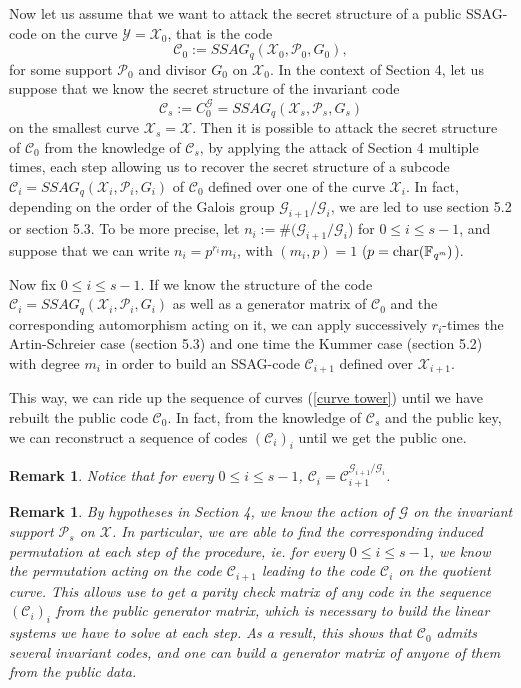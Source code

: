 \documentclass[10pt]{article}
\newtheorem{rq1}[thm]{Remark}
\newcommand{\s}{\vspace{0.3cm}}
\newcommand{\C}{\mathcal{C}}
\newcommand{\fqm}{\mathbb{F}_{q^m}}
\newcommand{\X}{\mathcal{X}}
\newcommand{\Y}{\mathcal{Y}}
\newcommand{\PR}{\mathcal{P}}
\newcommand{\G}{\mathcal{G}}
\begin{document}
Now let us assume that we want to attack the secret structure of a public SSAG-code on the curve $\Y=\X_0$, that is the code 
\[\C_0 := SSAG_q(\X_0,\PR_0,G_0),\]
for some support $\PR_0$ and divisor $G_0$ on $\X_0$. In the context of Section 4, let us suppose that we know the secret structure of the invariant code 
\[\C_s:= C_0^{\G} = SSAG_q(\X_s,\PR_s,G_s)\]
on the smallest curve $\X_s=\X$. Then it is possible to attack the secret structure of $\C_0$ from the knowledge of $\C_s$, by applying the attack of Section 4 multiple times, each step allowing us to recover the secret structure of a subcode $\C_i=SSAG_q(\X_i,\PR_i,G_i)$ of $\C_0$ defined over one of the curve $\X_i$. In fact, depending on the order of the Galois group $\G_{i+1}/\G_i$, we are led to use section 5.2 or section 5.3. 
To be more precise, let $n_i:= \#(\G_{i+1}/\G_i$) for $0 \leq i \leq s-1$, and suppose that we can write $n_i = p^{r_i}m_i$, with $(m_i,p)=1$ ($p=\rm char \it (\fqm)$). 
\s

Now fix $0 \leq i \leq s-1$. If we know the structure of the code $\C_i = SSAG_q(\X_i,\PR_i,G_i)$ as well as a generator matrix of $\C_0$ and the corresponding automorphism acting on it, we can apply successively $r_i$-times the Artin-Schreier case (section 5.3) and one time the Kummer case (section 5.2) with degree $m_i$ in order to build an SSAG-code $\C_{i+1}$ defined over $\X_{i+1}$. 

This way, we can ride up the sequence of curves (\ref{curve tower}) until we have rebuilt the public code $\C_0$. In fact, from the knowledge of $\C_s$ and the public key, we can reconstruct a sequence of codes $(\C_i)_i$ until we get the public one. 

\s

\begin{rq1} \rm
Notice that for every $0 \leq i \leq s-1$, $\C_i = \C_{i+1}^{\G_{i+1}/\G_i}$. 
\end{rq1}


\begin{rq1} \rm \label{induced permutation} By hypotheses in Section 4, we know the action of $\G$ on the invariant support $\PR_s$ on $\X$. In particular, we are able to find the corresponding induced permutation at each step of the procedure, ie. for every $0 \leq i \leq s-1$, we know the permutation acting on the code $\C_{i+1}$ leading to the code $\C_i$ on the quotient curve. This allows use to get a parity check matrix of any code in the sequence $(\C_i)_i$ from the public generator matrix, which is necessary to build the linear systems we have to solve at each step. As a result, this shows that $\C_0$ admits several invariant codes, and one can build a generator matrix of anyone of them from the public data.
\end{rq1}
\end{document}
